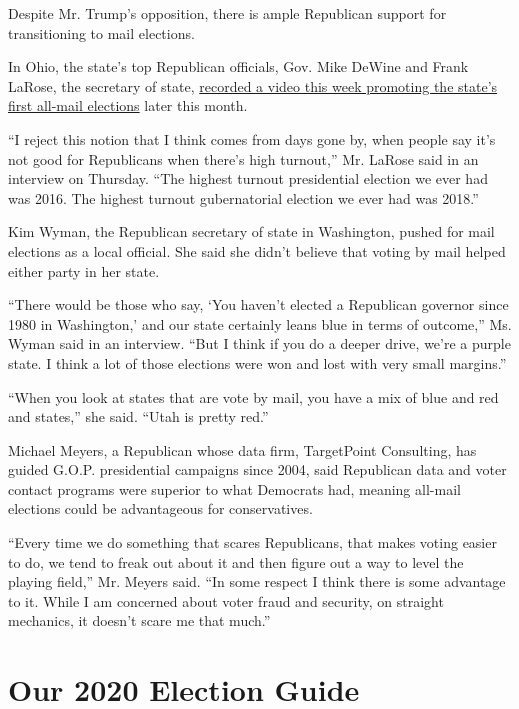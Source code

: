 Despite Mr. Trump's opposition, there is ample Republican support for
transitioning to mail elections.

In Ohio, the state's top Republican officials, Gov. Mike DeWine and
Frank LaRose, the secretary of state,
\href{https://www.youtube.com/watch?v=gYliBlyROxo\&feature=youtu.be}{recorded
a video this week promoting the state's first all-mail elections} later
this month.

``I reject this notion that I think comes from days gone by, when people
say it's not good for Republicans when there's high turnout,'' Mr.
LaRose said in an interview on Thursday. ``The highest turnout
presidential election we ever had was 2016. The highest turnout
gubernatorial election we ever had was 2018.''

Kim Wyman, the Republican secretary of state in Washington, pushed for
mail elections as a local official. She said she didn't believe that
voting by mail helped either party in her state.

``There would be those who say, `You haven't elected a Republican
governor since 1980 in Washington,' and our state certainly leans blue
in terms of outcome,'' Ms. Wyman said in an interview. ``But I think if
you do a deeper drive, we're a purple state. I think a lot of those
elections were won and lost with very small margins.''

``When you look at states that are vote by mail, you have a mix of blue
and red and states,'' she said. ``Utah is pretty red.''

Michael Meyers, a Republican whose data firm, TargetPoint Consulting,
has guided G.O.P. presidential campaigns since 2004, said Republican
data and voter contact programs were superior to what Democrats had,
meaning all-mail elections could be advantageous for conservatives.

``Every time we do something that scares Republicans, that makes voting
easier to do, we tend to freak out about it and then figure out a way to
level the playing field,'' Mr. Meyers said. ``In some respect I think
there is some advantage to it. While I am concerned about voter fraud
and security, on straight mechanics, it doesn't scare me that much.''

\hypertarget{our-2020-election-guide}{%
\section{Our 2020 Election Guide}\label{our-2020-election-guide}}

